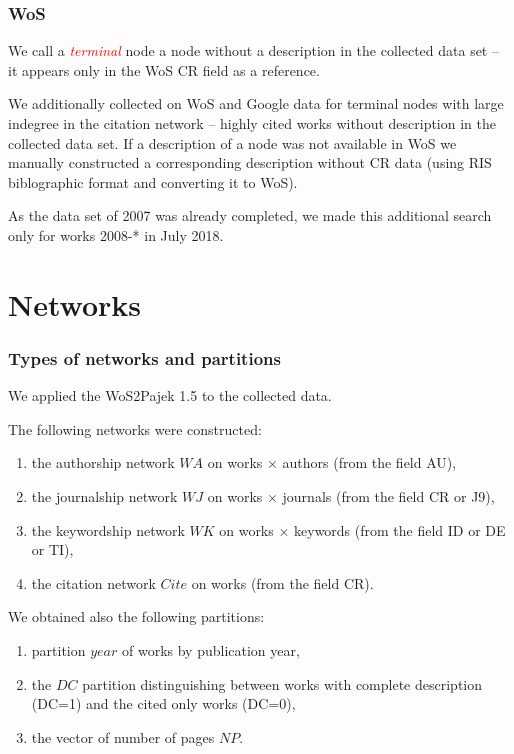 \documentclass[hyperref={pdfstartview={FitBH -32768},
                         pdfpagemode=FullScreen,
                         plainpages=false,
                         colorlinks=true}
              ]{beamer}
\newcommand{\keyw}[1]{\textcolor{red}{\emph{#1}}}
\begin{document}
\begin{frame}[fragile]
\frametitle{WoS}
\small

We call a \keyw{terminal} node  a node without a description in the collected data set -- it appears only in the WoS CR field as a reference. \medskip

We additionally collected on WoS and Google data for terminal nodes with large indegree in the citation network -- highly cited works without description in the collected data set. If a description of a node was not available in WoS we manually constructed a corresponding description without CR data (using RIS biblographic format and converting it to WoS).\medskip

As the data set of 2007 was already completed, we made this additional search only for works 2008-* in July 2018. 
\end{frame}


\section{Networks}


\begin{frame}[fragile]
\frametitle{Types of networks and partitions}
\small
We applied the WoS2Pajek 1.5  to the collected data.\medskip

The following networks were constructed: 
\begin{enumerate}
\item the authorship network $WA$ on works $\times$ authors  (from the field AU), 
\item the journalship network $WJ$ on  works $\times$ journals  (from the field CR or J9), 
\item the keywordship network $WK$ on works  $\times$ keywords (from the field ID or DE or TI), 
\item the citation network $Cite$ on works (from the field CR).
\end{enumerate}

We obtained also the following partitions: 
\begin{enumerate}
\item partition $year$ of works by publication year, 
\item the $DC$ partition distinguishing between works with complete description (DC=1) and the cited only works (DC=0),
\item the vector of number of pages $NP$.
\end{enumerate}
\medskip

\end{frame}
\end{document}
